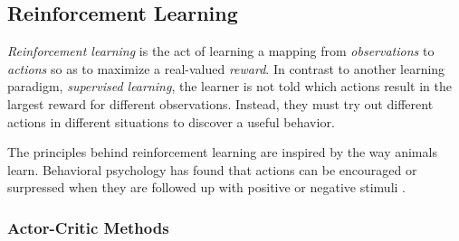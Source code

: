 \subsection{Reinforcement Learning}
\textit{Reinforcement learning} is the act of learning a mapping from \textit{observations} to \textit{actions} so as to maximize a real-valued \textit{reward}. In contrast to another learning paradigm, \textit{supervised learning}, the learner is not told which actions result in the largest reward for different observations. Instead, they must try out different actions in different situations to discover a useful behavior. \cite{bible}

The principles behind reinforcement learning are inspired by the way animals learn. Behavioral psychology has found that actions can be encouraged or surpressed when they are followed up with positive or negative stimuli \cite{thorndike}.





\subsubsection{Actor-Critic Methods}